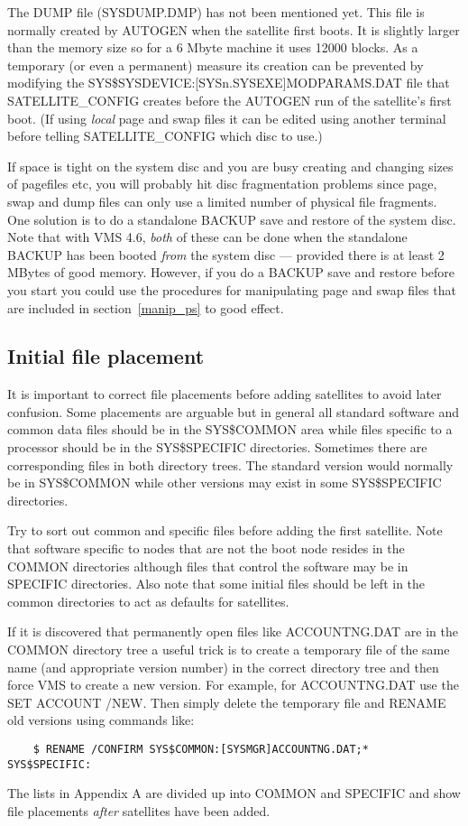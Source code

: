 The DUMP file (SYSDUMP.DMP) has not been mentioned yet.
This file is normally created by AUTOGEN when the satellite first boots.
It is slightly larger than the memory size so for a 6 Mbyte machine it uses
12000 blocks.
As a temporary (or even a permanent) measure its creation can be prevented
by modifying the SYS\$SYSDEVICE:[SYSn.SYSEXE]MODPARAMS.DAT file that 
SATELLITE\_CONFIG creates before the AUTOGEN run of the satellite's first boot.
(If using {\em local} page and swap files it can be edited
using another terminal before telling SATELLITE\_CONFIG which disc to use.)

If space is tight on the system disc and you are busy creating and changing
sizes of pagefiles etc, you will probably hit disc fragmentation problems
since page, swap and dump files can only use a limited number of physical
file fragments.
One solution is to do a standalone BACKUP save and restore of the system
disc. Note that with VMS 4.6, {\em both} of these can be done when the
standalone BACKUP has been booted {\em from} the system disc --- provided there
is at least 2 MBytes of good memory.
However, if you do a BACKUP save and restore before you start you could
use the procedures for manipulating page and swap files that are included
in section~\ref{manip_ps} to good effect.

\subsection {Initial file placement}

It is important to correct file placements before adding satellites to avoid
later confusion.
Some placements are arguable but in general all standard software and common
data files should be in the SYS\$COMMON area while files specific to a processor
should be in the SYS\$SPECIFIC directories.
Sometimes there are corresponding files in both directory trees.
The standard version would normally be in SYS\$COMMON while other versions
may exist in some SYS\$SPECIFIC directories.

Try to sort out common and specific files before adding the first satellite.
Note that software specific to nodes that are not the boot node resides
in the COMMON directories although files that control the software may be
in SPECIFIC directories.
Also note that some initial files should be left in the common directories
to act as defaults for satellites.

If it is discovered that permanently open files like ACCOUNTNG.DAT are in the
COMMON directory tree a useful trick is to create a temporary file of the
same name (and appropriate version number) in the correct directory tree
and then force VMS to create a new version.
For example, for ACCOUNTNG.DAT use the SET ACCOUNT /NEW.
Then simply delete the temporary file and RENAME old versions using commands
like:
\begin{verbatim}
    $ RENAME /CONFIRM SYS$COMMON:[SYSMGR]ACCOUNTNG.DAT;*  SYS$SPECIFIC:
\end{verbatim}
The lists in Appendix A are divided up into COMMON and SPECIFIC and show file
placements {\em after} satellites have been added. 

